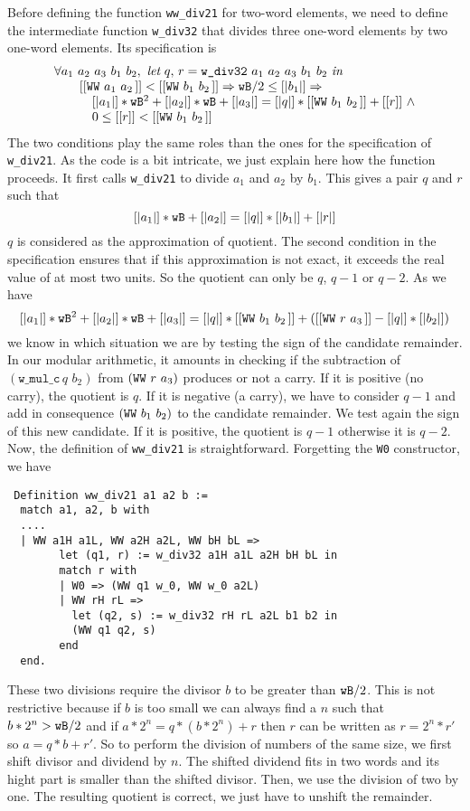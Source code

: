 Before defining the function {\tt ww\_div21} for two-word elements,
we need to define the intermediate function  {\tt w\_div32}
that divides three one-word elements by two one-word elements.
Its specification is
$$\begin{array}{l}
\forall a_1\,\, a_2\,\, a_3\,\, b_1\,\, b_2, \,\, \textit{let}\,\, q,\, r = \texttt{w\_div32}\,\, a_1\,\, a_2\,\, a_3\,\, b_1\,\, b_2\,\, \textit{in}\\
 \hskip20pt [[\texttt{WW}\,\,a_1\,\,a_2\,]] < [[\texttt{WW}\,\,b_1\,\,b_2\,]] \Rightarrow {\texttt{wB}} / 2 \le [|b_1|] \Rightarrow\\
 \hskip30pt [|a_1|] * {\texttt{wB}} ^ 2 + [|a_2|] * {\texttt{wB}}  + [|a_3|] =   [|q|] *  [[\texttt{WW}\,\,b_1\,\,b_2\,]] + [[r]] \,\,\land  \\
 \hskip30pt 0 \le [[r]] < [[\texttt{WW}\,\,b_1\,\,b_2\,]]
\end{array}
$$
The two conditions play the same roles than the ones for the specification of {\tt w\_div21}.
As the code is a bit intricate, we just explain here how the function
proceeds. It first calls {\tt w\_div21} to divide $a_1$ and $a_2$
by $b_1$. This gives a pair $q$ and $r$ such that
$$[|a_1|] * {\texttt{wB}} + [|a_2|] = [|q|] * [|b_1|] + [|r|]$$
$q$ is considered as the approximation of quotient.
The second condition in the specification ensures that if this approximation
is not exact, it exceeds the real value of at most two units. So the quotient 
can only be $q$, $q - 1$ or $q - 2$. 
As we have 
$$[|a_1|] *  {\texttt{wB}} ^ 2  + [|a_2|] * {\texttt{wB}} + [|a_3|] = [|q|] * [[\texttt{WW}\,\,b_1\,\,b_2\,]] + ([[\texttt{WW}\,\,r\,\,a_3\,]] - [|q|] * [|b_2|])$$
we know in which situation we are by testing the sign of the candidate
remainder.
In our modular arithmetic, it amounts in checking if the subtraction of
$(\texttt{w\_mul\_c}\, q\,\, b_2)$ from $(\texttt{WW}\,\,r\,\,a_3\,\!)$
produces or not a carry.  
If it is positive (no carry), the quotient is $q$. If it is negative (a carry), we
have to consider $q - 1$ and add in consequence $(\texttt{WW}\,\,b_1\,\,b_2\,\!)$ to the candidate remainder.
We test again the sign of this new candidate. If it is positive, the quotient is $q - 1$
otherwise it is $q - 2$.
Now, the definition of {\tt ww\_div21} is straightforward. Forgetting the {\tt W0}
constructor, we have
\begin{verbatim} 
 Definition ww_div21 a1 a2 b :=
  match a1, a2, b with
  ....  
  | WW a1H a1L, WW a2H a2L, WW bH bL =>
        let (q1, r) := w_div32 a1H a1L a2H bH bL in
        match r with
        | W0 => (WW q1 w_0, WW w_0 a2L)
        | WW rH rL =>
          let (q2, s) := w_div32 rH rL a2L b1 b2 in
          (WW q1 q2, s)
        end
  end.
\end{verbatim}
These two divisions require the divisor $b$ to be greater than ${\texttt{wB}}/2$. This is not restrictive
because if $b$ is too small we can always find a $n$ such that $b* 2 ^n > {\texttt{wB}}/2$ and
if $a * 2 ^ n  =  q  * (b * 2 ^ n) + r$ then $r$ can be written as $r = 2^n * r'$ so
$a = q * b + r'$. So to perform the division of numbers of the same size, we first shift
divisor and dividend by $n$. The shifted dividend fits in two words and its hight part is smaller
than the shifted divisor. Then, we use the division of two by one. The resulting
quotient is correct, we just have to unshift the remainder.

